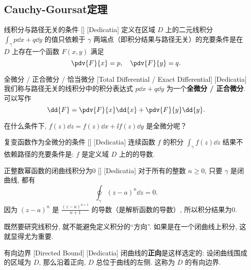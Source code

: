 \documentclass[UTF8]{ctexart}
\begin{document}
    \subsection{Cauchy-Goursat定理}
        \begin{thm}
            [UUID]
            {线积分与路径无关的条件}
            []
            [Dedicatia]
            定义在区域 \(D\) 上的二元线积分 \(\int_\gamma p\dd{x}+q\dd{y}\) 的值只依赖于 \(\gamma\) 两端点（即积分结果与路径无关）的充要条件是在 \(D\) 上存在一个函数 \(F(x,y)\) 满足
            \[\pdv{F}{x}=p,\quad\pdv{F}{y}=q.\]
        \end{thm}

        \begin{dfn}
            [ExactDifferential]
            {全微分 / 正合微分 / 恰当微分}
            [Total Differential / Exact Differential]
            [Dedicatia]
            我们称与路径无关的线积分中的积分表达式 \(p\dd{x}+q\dd{y}\) 为一个\textbf{全微分 / 正合微分}. 可以写作
            \[\dd{F}=\pdv{F}{x}\dd{x}+\pdv{F}{y}\dd{y}.\]
        \end{dfn}

        在什么条件下,  \(f(z)\dd{z}=f(z)\dd{x}+\ii f(z)\dd{y}\) 是全微分呢？

        \begin{crl}
            [UUID]
            {复变函数作为全微分的条件}
            []
            [Dedicatia]
            连续函数 \(f\) 的积分 \(\int_\gamma f(z)\dd{z}\) 结果不依赖路径的充要条件是:  \(f\) 是定义域 \(D\) 上的 的导数. 
        \end{crl}

        \begin{xmp}
            [UUID]
            {正整数幂函数的闭曲线积分为0}
            []
            [Dedicatia]
            对于所有的整数 \(n\geqslant 0\), 只要 \(\gamma\) 是闭曲线, 都有
            \[\oint_\gamma (z-a)^n\dd{z}=0.\]
            因为 \((z-a)^n\) 是 \(\frac{(z-a)^{n+1}}{n+1}\) 的导数（是解析函数的导数）, 所以积分结果为0. 
        \end{xmp}

        既然要研究线积分, 就不能避免定义积分的“方向”. 如果是在一个闭曲线上积分, 这就显得尤为重要. 

        \begin{dfn}
            [UUID]
            {有向边界}
            [Directed Bound]
            [Dedicatia]
            闭曲线的\textbf{正向}是这样选定的: 设闭曲线围成的区域为 \(D\), 那么沿着正向,  \(D\) 总位于曲线的左侧. 这称为 \(D\) 的有向边界. 
        \end{dfn}
\end{document}
